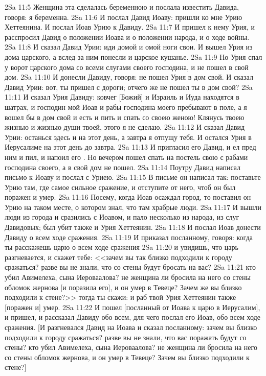 \vs 2Sa 11:5 Женщина эта сделалась беременною и послала известить Давида, говоря: я беременна.
\vs 2Sa 11:6 И послал Давид  Иоаву: пришли ко мне Урию Хеттеянина. И послал Иоав Урию к Давиду.
\vs 2Sa 11:7 И пришел к нему Урия, и расспросил  Давид о положении Иоава и о положении народа, и о ходе войны.
\vs 2Sa 11:8 И сказал Давид Урии: иди домой и омой ноги свои. И вышел Урия из дома царского, а вслед за ним понесли и царское кушанье.
\vs 2Sa 11:9 Но Урия спал у ворот царского дома со всеми слугами своего господина, и не пошел в свой дом.
\vs 2Sa 11:10 И донесли Давиду, говоря: не пошел Урия в дом свой. И сказал Давид Урии: вот, ты пришел с дороги; отчего же не пошел ты в дом свой?
\vs 2Sa 11:11 И сказал Урия Давиду: ковчег [Божий] и Израиль и Иуда находятся в шатрах, и господин мой Иоав и рабы господина моего пребывают в поле, а я вошел бы в дом свой и есть и пить и спать со своею женою! Клянусь твоею жизнью и жизнью души твоей, этого я не сделаю.
\vs 2Sa 11:12 И сказал Давид Урии: останься здесь и на этот день, а завтра я отпущу тебя. И остался Урия в Иерусалиме на этот день до завтра.
\vs 2Sa 11:13 И пригласил его Давид, и ел  пред ним и пил, и напоил его . Но вечером  пошел спать на постель свою с рабами господина своего, а в свой дом не пошел.
\vs 2Sa 11:14 Поутру Давид написал письмо к Иоаву и послал  с Уриею.
\vs 2Sa 11:15 В письме он написал так: поставьте Урию там, где  самое сильное сражение, и отступите от него, чтоб он был поражен и умер.
\vs 2Sa 11:16 Посему, когда Иоав осаждал город, то поставил он Урию на таком месте, о котором знал, что там храбрые люди.
\vs 2Sa 11:17 И вышли люди из города и сразились с Иоавом, и пало несколько из народа, из слуг Давидовых; был убит также и Урия Хеттеянин.
\vs 2Sa 11:18 И послал Иоав донести Давиду о всем ходе сражения.
\vs 2Sa 11:19 И приказал посланному, говоря: когда ты расскажешь царю о всем ходе сражения
\vs 2Sa 11:20 и увидишь, что царь разгневается, и скажет тебе: <<зачем вы так близко подходили к городу сражаться? разве вы не знали, что со стены будут бросать на вас?
\vs 2Sa 11:21 кто убил Авимелеха, сына Иероваалова? не женщина ли бросила на него со стены обломок жернова [и поразила его], и он умер в Тевеце? Зачем же вы близко подходили к стене?>> тогда ты скажи: и раб твой Урия Хеттеянин также [поражен и] умер.
\vs 2Sa 11:22 И пошел [посланный от Иоава к царю в Иерусалим], и пришел, и рассказал Давиду обо всем, для чего послал его Иоав, обо всем ходе сражения. [И разгневался Давид на Иоава и сказал посланному: зачем вы близко подходили к городу сражаться? разве вы не знали, что вас поражать будут со стены? кто убил Авимелеха, сына Иероваалова? не женщина ли бросила на него со стены обломок жернова, и он умер в Тевеце? Зачем вы близко подходили к стене?]
